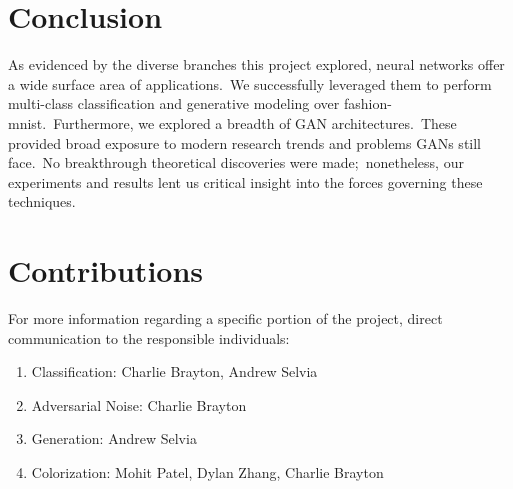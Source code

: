 \documentclass[conference]{IEEEtran}
\begin{document}
    \section{Conclusion}\label{sec:conclusion}

    As evidenced by the diverse branches this project explored, neural networks offer a wide surface area of applications.\ We successfully leveraged them to perform multi-class classification and generative modeling over fashion-mnist.\ Furthermore, we explored a breadth of GAN architectures.\ These provided broad exposure to modern research trends and problems GANs still face.\ No breakthrough theoretical discoveries were made;\ nonetheless, our experiments and results lent us critical insight into the forces governing these techniques.

    \section{Contributions}\label{sec:contributions}

    For more information regarding a specific portion of the project, direct communication to the responsible individuals:

    \begin{enumerate}
        \item Classification: Charlie Brayton, Andrew Selvia
        \item Adversarial Noise: Charlie Brayton
        \item Generation: Andrew Selvia
        \item Colorization: Mohit Patel, Dylan Zhang, Charlie Brayton
    \end{enumerate}

    
    
\end{document}
